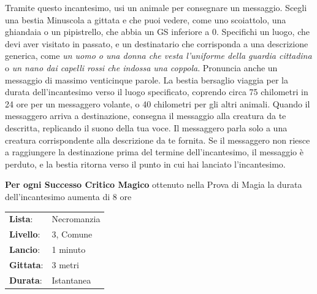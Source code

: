 \begin{multicols}{2}
\label{Animal Messenger}Tramite questo incantesimo, usi un animale per consegnare un messaggio. Scegli una bestia Minuscola a gittata e che puoi vedere, come uno scoiattolo, una ghiandaia o un pipistrello, che abbia un GS inferiore a 0. Specifichi un luogo, che devi aver visitato in passato, e un destinatario che corrisponda a una descrizione generica, come \emph{un uomo o una donna che vesta l'uniforme della guardia cittadina} o \emph{un nano dai capelli rossi che indossa una coppola}. Pronuncia anche un messaggio di massimo venticinque parole. La bestia bersaglio viaggia per la durata dell'incantesimo verso il luogo specificato, coprendo circa 75 chilometri in 24 ore per un messaggero volante, o 40 chilometri per gli altri animali. Quando il messaggero arriva a destinazione, consegna il messaggio alla creatura da te descritta, replicando il suono della tua voce. Il messaggero parla solo a una creatura corrispondente alla descrizione da te fornita. Se il messaggero non riesce a raggiungere la destinazione prima del termine dell'incantesimo, il messaggio è perduto, e la bestia ritorna verso il punto in cui hai lanciato l'incantesimo.

\textbf{Per ogni Successo Critico Magico} ottenuto nella Prova di Magia la durata dell'incantesimo aumenta di 8 ore

\noindent\begin{tabularx}{\linewidth}{p{1.3cm}X}
	\rowcolor{gray!20}\textbf{Lista}: & Necromanzia \\
	\textbf{Livello}: & 3, Comune \\
	\rowcolor{gray!20}\textbf{Lancio}: & 1 minuto \\
	\textbf{Gittata}: & 3 metri \\
	\rowcolor{gray!20}\textbf{Durata}: & Istantanea \\
\end{tabularx}\smallskip


\end{multicols}
